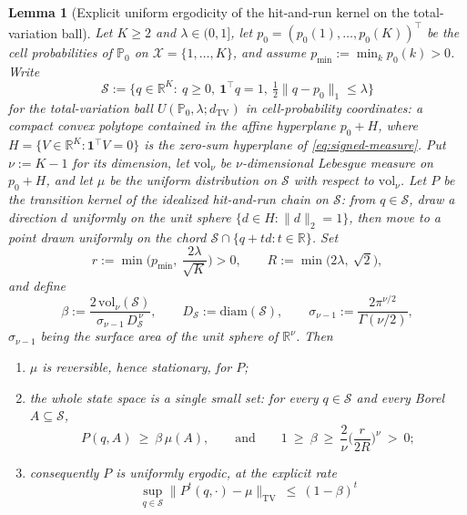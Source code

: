 \documentclass[11pt]{article}
\theoremstyle{plain}
\newtheorem{lemma}[theorem]{Lemma}
\theoremstyle{definition}
\theoremstyle{remark}
\newcommand{\PP}{\mathbb{P}}
\newcommand{\R}{\mathbb{R}}
\newcommand{\cX}{\mathcal{X}}
\newcommand{\cS}{\mathcal{S}}
\begin{document}
\begin{lemma}[Explicit uniform ergodicity of the hit-and-run kernel on the
total-variation ball]\label{lem:uniform-ergodicity}
Let $K\ge2$ and $\lambda\in(0,1]$, let $p_0=(p_0(1),\dots,p_0(K))^\top$ be the cell
probabilities of $\PP_0$ on $\cX=\{1,\dots,K\}$, and assume $p_{\min}:=\min_kp_0(k)>0$.
Write
\begin{equation}\label{eq:polytope}
    \cS := \big\{q\in\R^K:\ q\ge0,\ \mathbf1^\top q=1,\ \tfrac12\|q-p_0\|_1\le\lambda\big\}
\end{equation}
for the total-variation ball $U(\PP_0,\lambda;d_{\mathrm{TV}})$ in cell-probability
coordinates: a compact convex polytope contained in the affine hyperplane $p_0+H$, where
$H=\{V\in\R^K:\mathbf1^\top V=0\}$ is the zero-sum hyperplane of
\eqref{eq:signed-measure}. Put $\nu:=K-1$ for its dimension, let $\mathrm{vol}_\nu$ be
$\nu$-dimensional Lebesgue measure on $p_0+H$, and let $\mu$ be the uniform distribution
on $\cS$ with respect to $\mathrm{vol}_\nu$. Let $P$ be the transition kernel of the
\emph{idealized} hit-and-run chain on $\cS$: from $q\in\cS$, draw a direction $d$
uniformly on the unit sphere $\{d\in H:\|d\|_2=1\}$, then move to a point drawn uniformly
on the chord $\cS\cap\{q+td:t\in\R\}$. Set
\begin{equation}\label{eq:radii}
    r := \min\Big(p_{\min},\ \frac{2\lambda}{\sqrt K}\Big)>0, \qquad
    R := \min\big(2\lambda,\ \sqrt2\big),
\end{equation}
and define
\[
    \beta := \frac{2\,\mathrm{vol}_\nu(\cS)}{\sigma_{\nu-1}\,D_\cS^{\,\nu}},
    \qquad D_\cS := \mathrm{diam}(\cS),
    \qquad \sigma_{\nu-1} := \frac{2\pi^{\nu/2}}{\Gamma(\nu/2)},
\]
$\sigma_{\nu-1}$ being the surface area of the unit sphere of $\R^\nu$. Then
\begin{enumerate}[label=(\alph*)]
\item $\mu$ is reversible, hence stationary, for $P$;
\item the whole state space is a single small set: for every $q\in\cS$ and every Borel
    $A\subseteq\cS$,
    \begin{equation}\label{eq:minorization}
        P(q,A)\ \ge\ \beta\,\mu(A),
        \qquad\text{and}\qquad
        1\ \ge\ \beta\ \ge\ \frac{2}{\nu}\Big(\frac{r}{2R}\Big)^{\nu}\ >\ 0;
    \end{equation}
\item consequently $P$ is uniformly ergodic, at the explicit rate
    \begin{equation}\label{eq:unif-erg}
        \sup_{q\in\cS}\big\|P^t(q,\cdot)-\mu\big\|_{\mathrm{TV}}\ \le\ (1-\beta)^t

\end{equation}
\end{enumerate}
\end{lemma}
\end{document}
